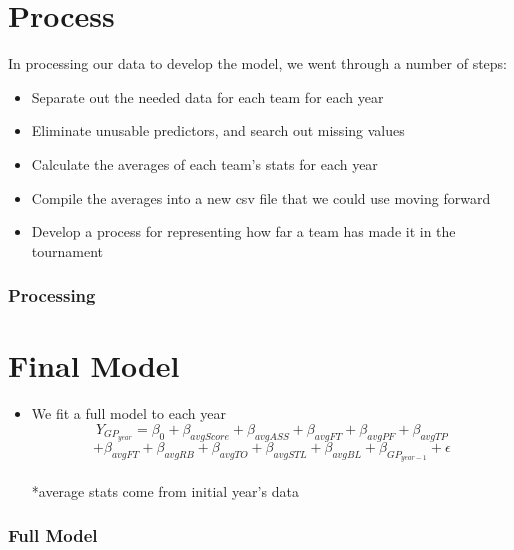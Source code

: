 \documentclass[11pt]{beamer}
\begin{document}
\section{Process}
\begin{frame}
In processing our data to develop the model, we went through a number of steps:
\begin{itemize}
	\footnotesize
	\item Separate out the needed data for each team for each year
	\item Eliminate unusable predictors, and search out missing values
	\item Calculate the averages of each team's stats for each year
	\item Compile the averages into a new csv file that we could use moving forward
	\item Develop a process for representing how far a team has made it in the tournament
\end{itemize}
\frametitle{{\textbf{\huge Processing}}}
\end{frame}
\section{Final Model}
\begin{frame}
\begin{itemize}
	\item We fit a full model to each year
	\large
	\[
	Y_{GP_{year}} = \beta_0 + \beta_{avgScore} + \beta_{avgASS} +\beta_{avgFT} + \beta_{avgPF} + \beta_{avgTP} 
	\]
	\[
+ \beta_{avgFT} + \beta_{avgRB} + \beta_{avgTO} + \beta_{avgSTL} +\beta_{avgBL} + \beta_{GP_{year-1}}+ \epsilon
	\]
	\\
	\footnotesize
	*average stats come from initial year's data
\end{itemize}
\frametitle{{\textbf{\huge Full Model}}}
\end{frame}
\end{document}

